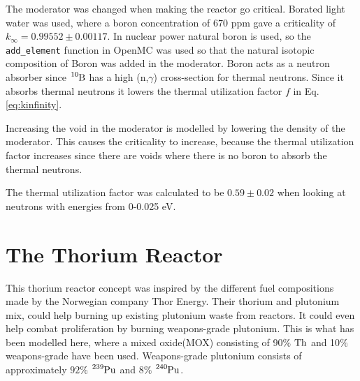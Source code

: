 \documentclass[norsk,a4paper,12pt]{article}
\begin{document}
\begin{multicols}{2}
The moderator was changed when making the reactor go critical. Borated light water was used, where a boron concentration of $670$ ppm gave a criticality of $k_{\infty} = 0.99552 \pm 0.00117$. In nuclear power natural boron is used\cite{nuclear-power-boron}, so the \texttt{add\_element} function in OpenMC was used so that the natural isotopic composition of Boron was added in the moderator. Boron acts as a neutron absorber since $\ce{^{10}B}$ has a high (n,$\gamma$) cross-section for thermal neutrons. Since it absorbs thermal neutrons it lowers the thermal utilization factor $f$ in Eq. \ref{eq:kinfinity}. 



Increasing the void in the moderator is modelled by lowering the density of the moderator. This causes the criticality to increase, because the thermal utilization factor increases since there are voids where there is no boron to absorb the thermal neutrons.

The thermal utilization factor was calculated to be $0.59 \pm 0.02$ when looking at neutrons with energies from 0-0.025 eV.


\section{The Thorium Reactor}
This thorium reactor concept was inspired by the different fuel compositions made by the Norwegian company Thor Energy\cite{thorenergy}. Their thorium and plutonium mix, could help burning up existing plutonium waste from reactors. It could even help combat proliferation by burning weapons-grade plutonium. This is what has been modelled here, where a mixed oxide(MOX) consisting of 90$\%$ $\ce{Th}$ and 10$\%$ weapons-grade have been used. Weapons-grade plutonium consists of approximately $92\%$ $\ce{^{239}Pu}$ and $8\%$ $\ce{^{240}Pu}$\cite{worldnuclear}.


\end{multicols}
\end{document}
